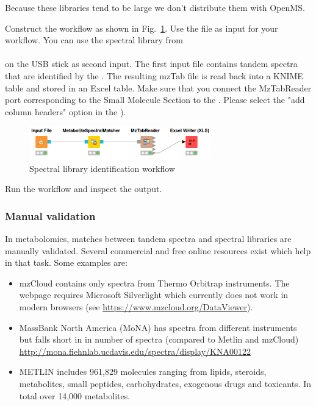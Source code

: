 \noindent Because these libraries tend to be large we don't distribute them with OpenMS. 

\begin{task}
Construct the workflow as shown in Fig.~\ref{fig:speclib}.
Use the file  as input for your workflow.  You can use the spectral library from \\
\\ on the USB stick as second input. 
The first input file contains tandem spectra that are identified by the . The resulting mzTab file is read back into a KNIME table and stored in an Excel table. Make sure that you connect the MzTabReader port corresponding to the Small Molecule Section to the . Please select the "add column headers" option in the ).

\end{task}

\begin{figure}[htbp]
  \centering
  \includegraphics[width=0.7\textwidth]{graphics/metabo/speclib.png}
  \caption{Spectral library identification workflow}
  \label{fig:speclib}
\end{figure}

Run the workflow and inspect the output.

\subsubsection{Manual validation}

In metabolomics, matches between tandem spectra and spectral libraries are manually validated. Several commercial and free online resources exist which help in that task. Some examples are:

\begin{itemize}
\item mzCloud contains only spectra from Thermo Orbitrap instruments. The webpage requires Microsoft Silverlight which currently does not work in modern browsers (see \url{https://www.mzcloud.org/DataViewer}).
\item MassBank North America (MoNA) has spectra from different instruments but falls short in in number of spectra (compared to Metlin and mzCloud) \url{http://mona.fiehnlab.ucdavis.edu/spectra/display/KNA00122}
\item METLIN includes 961,829 molecules ranging from lipids, steroids, metabolites, small peptides, carbohydrates, exogenous drugs and toxicants. In total over 14,000 metabolites.
\end{itemize}

